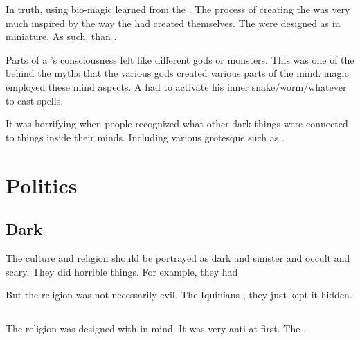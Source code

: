 In truth,  using bio-magic learned from the \xss.
The process of creating the \scathae was very much inspired by the way the \dragons had created themselves.
The \scathae were designed as \dragons in miniature.
As such, \scathae {} than .

Parts of a \scatha's consciousness felt like different gods or monsters. 
This was one of the  behind the myths that the various gods created various parts of the \scathaese mind. 
\Rethyax magic employed these mind aspects. 
A \rethyax had to activate his inner snake/worm/whatever to cast spells. 

It was horrifying when people recognized what other dark things were connected to things inside their minds.
Including various grotesque \xss such as \Ubloth.














\section{Politics}









\subsection{Dark}
The \Ortaican culture and religion should be portrayed as dark and sinister and occult and scary. 
They did horrible things. 
For example, they had 

But the \Ortaican religion was not necessarily evil.
The Iquinians , they just kept it hidden. 









\subsection{\Humans}
The \rethyax religion was designed with \scathae in mind.
It was very anti-\human at first. 
The . 

